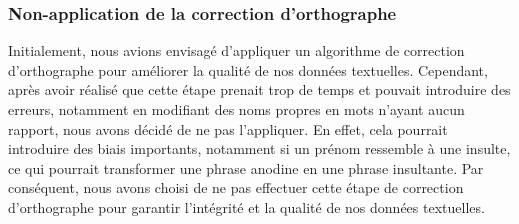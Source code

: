 \subsubsection*{Non-application de la correction d'orthographe}
Initialement, nous avions envisagé d'appliquer un algorithme de correction d'orthographe pour améliorer la qualité de nos données textuelles. Cependant, après avoir réalisé que cette étape prenait trop de temps et pouvait introduire des erreurs, notamment en modifiant des noms propres en mots n'ayant aucun rapport, nous avons décidé de ne pas l'appliquer. En effet, cela pourrait introduire des biais importants, notamment si un prénom ressemble à une insulte, ce qui pourrait transformer une phrase anodine en une phrase insultante. Par conséquent, nous avons choisi de ne pas effectuer cette étape de correction d'orthographe pour garantir l'intégrité et la qualité de nos données textuelles.

